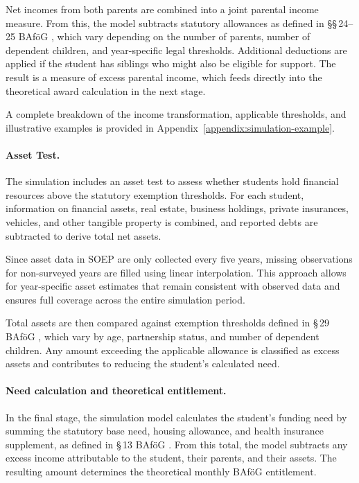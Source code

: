 Net incomes from both parents are combined into a joint parental income measure. 
From this, the model subtracts statutory allowances as defined in §§\,24–25 BAföG \citep{bafoeg_law}, which vary depending on the number of parents, number of dependent children, and year-specific legal thresholds. 
Additional deductions are applied if the student has siblings who might also be eligible for support. 
The result is a measure of excess parental income, which feeds directly into the theoretical award calculation in the next stage.

A complete breakdown of the income transformation, applicable thresholds, and illustrative examples is provided in Appendix~\ref{appendix:simulation-example}.

\paragraph{Asset Test.}
The simulation includes an asset test to assess whether students hold financial resources above the statutory exemption thresholds. 
For each student, information on financial assets, real estate, business holdings, private insurances, vehicles, and other tangible property is combined, and reported debts are subtracted to derive total net assets.

Since asset data in SOEP are only collected every five years, missing observations for non-surveyed years are filled using linear interpolation. 
This approach allows for year-specific asset estimates that remain consistent with observed data and ensures full coverage across the entire simulation period.

Total assets are then compared against exemption thresholds defined in §\,29 BAföG \citep{bafoeg_law}, which vary by age, partnership status, and number of dependent children. 
Any amount exceeding the applicable allowance is classified as excess assets and contributes to reducing the student's calculated need. 


\paragraph{Need calculation and theoretical entitlement.}
In the final stage, the simulation model calculates the student's funding need by summing the statutory base need, housing allowance, and health insurance supplement, as defined in §\,13 BAföG \citep{bafoeg_law}. 
From this total, the model subtracts any excess income attributable to the student, their parents, and their assets. 
The resulting amount determines the theoretical monthly BAföG entitlement.

